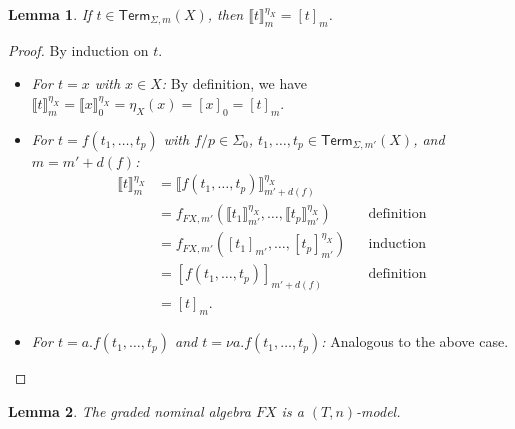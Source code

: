 \documentclass[11pt,a4paper]{amsart}
\newtheorem{lemma}[lemma]{Lemma}
\newcommand{\Term}{\mathsf{Term}}
\newcommand{\sig}{\Sigma}
\newcommand{\sigp}{\Sigma_0}
\theoremstyle{plain}
\numberwithin{equation}{section}
\newcommand{\+}[1]{\mathcal{#1}\xspace}
\theoremstyle{definition}
\begin{document}
\begin{lemma}\label{thm:canonicalenvironmentevaluation}
    If \(t \in \Term_{\sig, m}(X)\), then \(\llbracket t \rrbracket^{\eta_X}_m = [t]_m\).
\end{lemma}

\begin{proof}
    By induction on \(t\).
    \begin{itemize}
        \item
            \textit{For \(t = x\) with \(x \in X\):}
            By definition, we have \(\llbracket t \rrbracket^{\eta_X}_m = \llbracket x \rrbracket^{\eta_X}_0 = \eta_X(x) = [x]_0 = [t]_m\).
        \item
            \textit{For \(t = f(t_1, \ldots, t_p)\) with \(f/p \in \sigp\), \(t_1, \ldots, t_p \in \Term_{\sig, m'}(X)\), and \(m = m' + d(f)\):}
            \begin{align*}
                \llbracket t \rrbracket^{\eta_X}_m
                &= \llbracket f(t_1, \ldots, t_p) \rrbracket^{\eta_X}_{m' + d(f)} \\
                &= f_{FX, m'}(\llbracket t_1 \rrbracket^{\eta_X}_{m'}, \ldots, \llbracket t_p \rrbracket^{\eta_X}_{m'}) && \text{definition} \\
                &= f_{FX, m'}([t_1]_{m'}, \ldots, [t_p]^{\eta_X}_{m'}) && \text{induction} \\
                &= [f(t_1, \ldots, t_p)]_{m' + d(f)} && \text{definition} \\
                &= [t]_m.
            \end{align*}
        \item
            \textit{For \(t = a.f(t_1, \ldots, t_p)\) and \(t = \nu a.f(t_1, \ldots, t_p)\):}
            Analogous to the above case.
          \end{itemize}

\end{proof}

\begin{lemma}
    The graded nominal algebra \(FX\) is a \((T, n)\)-model.
\end{lemma}
\end{document}
